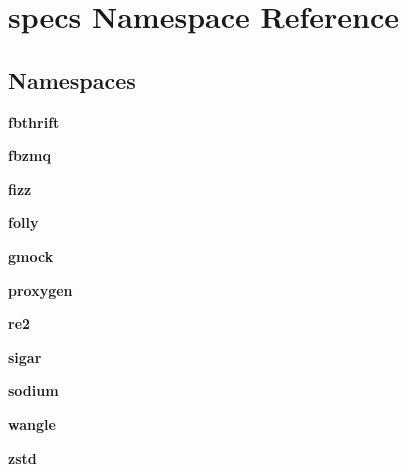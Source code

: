 \section{specs Namespace Reference}
\label{namespacespecs}
\subsection*{Namespaces}
\begin{DoxyCompactItemize}
\item 
 {\bf fbthrift}
\item 
 {\bf fbzmq}
\item 
 {\bf fizz}
\item 
 {\bf folly}
\item 
 {\bf gmock}
\item 
 {\bf proxygen}
\item 
 {\bf re2}
\item 
 {\bf sigar}
\item 
 {\bf sodium}
\item 
 {\bf wangle}
\item 
 {\bf zstd}
\end{DoxyCompactItemize}
